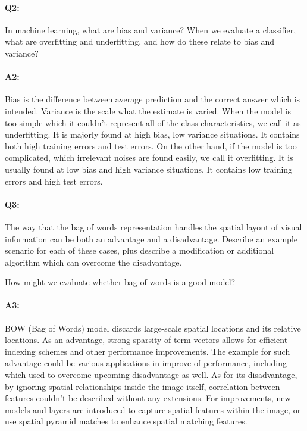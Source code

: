 
\pagebreak
\paragraph{Q2:} In machine learning, what are bias and variance? When we evaluate a classifier, what are overfitting and underfitting, and how do these relate to bias and variance?

\paragraph{A2:} Bias is the difference between average prediction and the correct answer which is intended. Variance is the scale what the estimate is varied. When the model is too simple which it couldn't represent all of the class characteristics, we call it as underfitting. It is majorly found at high bias, low variance situations. It contains both high training errors and test errors. On the other hand, if the model is too complicated, which irrelevant noises are found easily, we call it overfitting. It is usually found at low bias and high variance situations. It contains low training errors and high test errors.




\pagebreak
\paragraph{Q3:} The way that the bag of words representation handles the spatial layout of visual information can be both an advantage and a disadvantage. Describe an example scenario for each of these cases, plus describe a modification or additional algorithm which can overcome the disadvantage. 

How might we evaluate whether bag of words is a good model?

\paragraph{A3:} BOW (Bag of Words) model discards large-scale spatial locations and its relative locations. As an advantage, strong sparsity of term vectors allows for efficient indexing schemes and other performance improvements. The example for such advantage could be various applications in improve of performance, including which used to overcome upcoming disadvantage as well. As for its disadvantage, by ignoring spatial relationships inside the image itself, correlation between features couldn't be described without any extensions. For improvements, new models and layers are introduced to capture spatial features within the image, or use spatial pyramid matches to enhance spatial matching features. 

